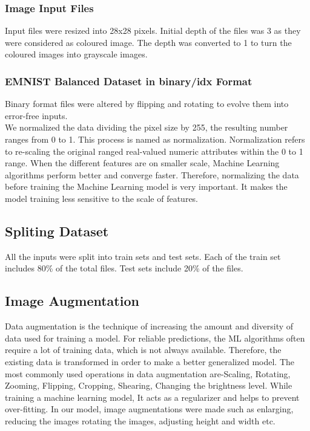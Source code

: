 \documentclass[conference]{IEEEtran}
\begin{document}
\subsubsection{Image Input Files}
Input files were resized into 28x28 pixels. Initial depth of the files was 3 as they were considered as coloured image. The depth was converted to 1 to turn the coloured images into grayscale images. 
\subsubsection{EMNIST Balanced Dataset in binary/idx Format}
Binary format files were altered by flipping and rotating to evolve them into error-free inputs. \\
We normalized the data dividing the pixel size by 255, the resulting number ranges from 0 to 1. This process is named as normalization. Normalization refers to re-scaling the original ranged real-valued numeric attributes within the 0 to 1 range. When the different features are on smaller scale, Machine Learning algorithms perform better and converge faster. Therefore, normalizing the data before training the Machine Learning model is very important. It makes the model training less sensitive to the scale of features.
\subsection{Spliting Dataset}
All the inputs were split into train sets and test sets. Each of the train set includes 80\% of the total files. Test sets include 20\% of the files.
\subsection{Image Augmentation}
Data augmentation is the technique of increasing the amount and diversity of data used for training a model. For reliable predictions, the ML algorithms often require a lot of training data, which is not always available. Therefore, the existing data is transformed in order to make a better generalized model. The most commonly used operations in data augmentation are-Scaling, Rotating, Zooming, Flipping, Cropping, Shearing, Changing the brightness level. While training a machine learning model, It acts as a regularizer and helps to prevent over-fitting. In our model, image augmentations were made such as enlarging, reducing the images rotating the images, adjusting height and width etc.
\end{document}

